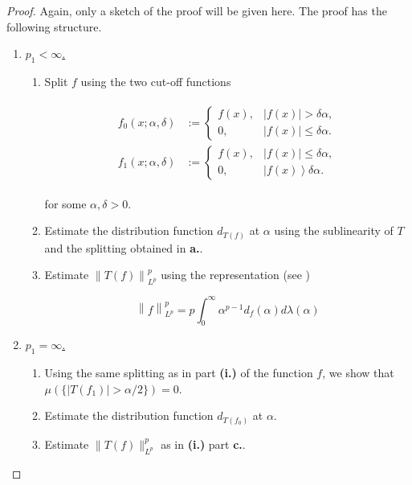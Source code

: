 \begin{proof}
	Again, only a sketch of the proof will be given here. The proof has the following structure.

	\begin{enumerate}[label = \textbf{(\roman*.)}]
		\item \underline{$p_1 < \infty$.}
			\begin{enumerate}[label = \textbf{\alph*.}]
				\item Split $f$ using the two cut-off functions

					\begin{gather*}
						\begin{aligned}
							f_0(x;\alpha,\delta) &:= \begin{cases}
							f(x), & \left| f(x) \right| > \delta \alpha,\\
							0, & \left| f(x)\right| \leqslant \delta \alpha.
						\end{cases}\\
						f_1(x;\alpha,\delta) &:= \begin{cases}
							f(x), & \left| f(x) \right| \leqslant \delta \alpha,\\
							0, & \left| f(x)\right > \delta \alpha.
						\end{cases}
					\end{aligned}
					\end{gather*}

					for some $\alpha, \delta > 0$.

				\item Estimate the distribution function $d_{T(f)}$ at $\alpha$ using the sublinearity of $T$ and the splitting obtained in \textbf{a.}.
				\item Estimate $\left\|T(f)\right\|_{L^p}^p$ using the representation (see \cite[5]{grafakos:fourier:2014})

					\begin{equation*}
						\left\| f \right\|_{L^p}^p = p\int_{0}^\infty \alpha^{p - 1}d_f(\alpha)d\lambda(\alpha)
					\end{equation*}
			\end{enumerate}
		\item \underline{$p_1 = \infty$.}
			\begin{enumerate}[label = \textbf{\alph*.}]
				\item Using the same splitting as in part \textbf{(i.)} of the function $f$, we show that $\mu(\{\left| T(f_1)\right| > \alpha/2\}) = 0$.
				\item Estimate the distribution function $d_{T(f_0)}$ at $\alpha$.
				\item Estimate $\|T(f)\|_{L^p}^p$ as in \textbf{(i.)} part \textbf{c.}.
			\end{enumerate}
	\end{enumerate}
	

	\end{proof}

